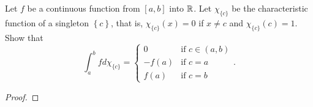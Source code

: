 \begin{problem}
Let $f$ be a continuous function from $[a,b]$ into $\mathbb{R}$. Let
$\chi_{\{c\}}$ be the characteristic function of a singleton
$\left\{c\right\}$, that is, $\chi_{\{c\}}(x)=0$ if $x\neq c$ and
$\chi_{\{c\}}(c)=1$. Show that
\[
\int_a^b f d \chi_{\{c\}}=
\begin{cases}
0&\text{if $c\in(a,b)$}\\
-f(a)&\text{if $c=a$}\\
f(a)&\text{if $c=b$}
\end{cases}.
\]
\end{problem}
\begin{proof}
\end{proof}

